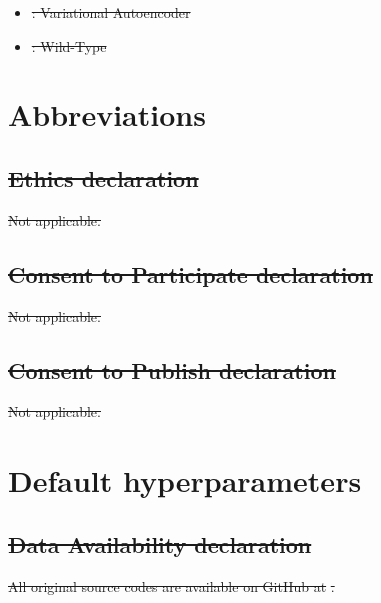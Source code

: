 \documentclass[referee, pdflatex, sn-vancouver-num]{sn-jnl}
\providecommand{\DIFdeltex}[1]{{\protect\color{red}\sout{#1}}}                      %
\providecommand{\DIFaddbegin}{} %
\providecommand{\DIFaddend}{} %
\providecommand{\DIFdelbegin}{} %
\providecommand{\DIFdelend}{} %
\providecommand{\DIFdel}[1]{\texorpdfstring{\DIFdeltex{#1}}{}} %
\newcommand{\DIFscaledelfig}{0.5}
\newlength{\DIFdelgraphicswidth} %
\newlength{\DIFdelgraphicsheight} %
\newcommand{\DIFaddincludegraphics}[2][]{{\color{blue}\fbox{\DIFOincludegraphics[#1]{#2}}}} %
\newcommand{\DIFdelincludegraphics}[2][]{%
\sbox{\DIFdelgraphicsbox}{\DIFOincludegraphics[#1]{#2}}%
\settoboxwidth{\DIFdelgraphicswidth}{\DIFdelgraphicsbox} %
\settoboxtotalheight{\DIFdelgraphicsheight}{\DIFdelgraphicsbox} %
\scalebox{\DIFscaledelfig}{%
\parbox[b]{\DIFdelgraphicswidth}{\usebox{\DIFdelgraphicsbox}\\[-\baselineskip] \rule{\DIFdelgraphicswidth}{0em}}\llap{\resizebox{\DIFdelgraphicswidth}{\DIFdelgraphicsheight}{%
\setlength{\unitlength}{\DIFdelgraphicswidth}%
\begin{picture}(1,1)%
\thicklines\linethickness{2pt} %
{\color[rgb]{1,0,0}\put(0,0){\framebox(1,1){}}}%
{\color[rgb]{1,0,0}\put(0,0){\line( 1,1){1}}}%
{\color[rgb]{1,0,0}\put(0,1){\line(1,-1){1}}}%
\end{picture}%
}\hspace*{3pt}}} %
} %
\DeclareRobustCommand{\DIFaddbegin}{\DIFOaddbegin \let\includegraphics\DIFaddincludegraphics} %
\DeclareRobustCommand{\DIFaddend}{\DIFOaddend \let\includegraphics\DIFOincludegraphics} %
\DeclareRobustCommand{\DIFdelbegin}{\DIFOdelbegin \let\includegraphics\DIFdelincludegraphics} %
\DeclareRobustCommand{\DIFdelend}{\DIFOaddend \let\includegraphics\DIFOincludegraphics} %
\begin{document}
\begin{appendices}
\begin{itemize}
\item%
\DIFdel{: Variational Autoencoder
    }%
\item%
\DIFdel{: Wild-Type
}
\end{itemize}%
\DIFdelend \DIFaddbegin \section{Abbreviations}\label{app:abbrev}
\DIFaddend

\DIFdelbegin %
\DIFdelend \DIFaddbegin \begingroup
\small
\setlength{\LTpre}{0pt}
\setlength{\LTpost}{0pt}
\DIFaddend

\DIFdelbegin \subsection*{\DIFdel{Ethics declaration}}
\DIFdel{Not applicable.
}\DIFdelend %

\DIFdelbegin \subsection*{\DIFdel{Consent to Participate declaration}}
\DIFdel{Not applicable.
}\DIFdelend \DIFaddbegin \endgroup
\DIFaddend

\DIFdelbegin \subsection*{\DIFdel{Consent to Publish declaration}}
\DIFdel{Not applicable.
}\DIFdelend \DIFaddbegin \section{Default hyperparameters}\label{app:hyperparams}
\DIFaddend


\DIFdelbegin \subsection*{\DIFdel{Data Availability declaration}}
\DIFdel{All original source codes are available on GitHub at }%
\DIFdel{.
}\DIFdelend %



\end{appendices}
\end{document}
